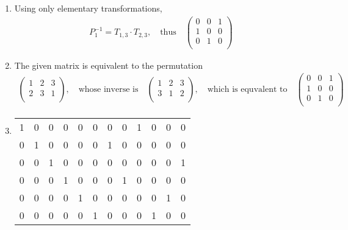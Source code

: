 \documentclass{article}
\begin{document}
\begin{enumerate}
    \item Using only elementary transformations,
    \begin{align*}
        P_1^{-1} = T_{1,3} \cdot T_{2,3}, \quad \text{thus} \quad
        \begin{pmatrix}
            0 & 0 & 1 \\
            1 & 0 & 0 \\
            0 & 1 & 0 \\
        \end{pmatrix}
    \end{align*}

    \item The given matrix is equivalent to the permutation
    \begin{align*}
        \begin{pmatrix}
            1 & 2 & 3 \\
            2 & 3 & 1 \\
        \end{pmatrix}, \quad \text{whose inverse is} \quad
        \begin{pmatrix}
            1 & 2 & 3 \\
            3 & 1 & 2 \\
        \end{pmatrix}, \quad \text{which is equvalent to} \quad
        \begin{pmatrix}
            0 & 0 & 1 \\
            1 & 0 & 0 \\
            0 & 1 & 0 \\
        \end{pmatrix}
    \end{align*}

    \item \phantom{} \begin{center}
        \begin{tabular}{c c c c c c | c c c c c c}
            1 & 0 & 0 & 0 & 0 & 0   & 0 & 0 & 1 & 0 & 0 & 0 \\
            0 & 1 & 0 & 0 & 0 & 0   & 1 & 0 & 0 & 0 & 0 & 0 \\
            0 & 0 & 1 & 0 & 0 & 0   & 0 & 0 & 0 & 0 & 0 & 1 \\
            0 & 0 & 0 & 1 & 0 & 0   & 0 & 1 & 0 & 0 & 0 & 0 \\
            0 & 0 & 0 & 0 & 1 & 0   & 0 & 0 & 0 & 0 & 1 & 0 \\
            0 & 0 & 0 & 0 & 0 & 1   & 0 & 0 & 0 & 1 & 0 & 0 \\
        \end{tabular}
    \end{center}


\end{enumerate}
\end{document}
